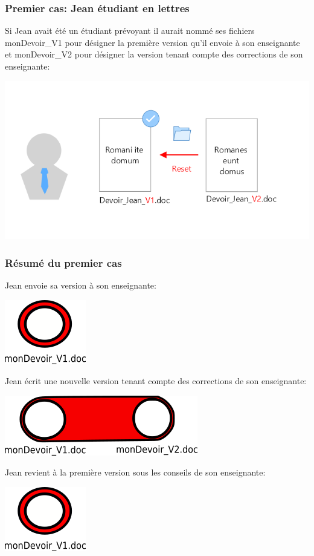 \documentclass{beamer}
\begin{document}
\begin{frame}
\frametitle{Premier cas: Jean étudiant en lettres}
Si Jean avait été un étudiant prévoyant il aurait nommé ses fichiers monDevoir\_V1 pour désigner la première version qu'il envoie à son enseignante et monDevoir\_V2 pour désigner la version tenant compte des corrections de son enseignante:
\begin{center}
    \includegraphics[scale=0.3]{images/firstScenario/firstScenario_diapo4.png}
\end{center}
\end{frame}

\begin{frame}
\frametitle{Résumé du premier cas}

Jean envoie sa version à son enseignante:
\begin{center}
    \includegraphics[scale=0.4]{images/firstScenario/firstScenario_branch2.png}
\end{center}

Jean écrit une nouvelle version tenant compte des corrections de son enseignante:
\begin{center}
    \includegraphics[scale=0.4]{images/firstScenario/firstScenario_branch1.png}
\end{center}

Jean revient à la première version sous les conseils de son enseignante:
\begin{center}
    \includegraphics[scale=0.4]{images/firstScenario/firstScenario_branch2.png}
\end{center}
\end{frame}
\end{document}
